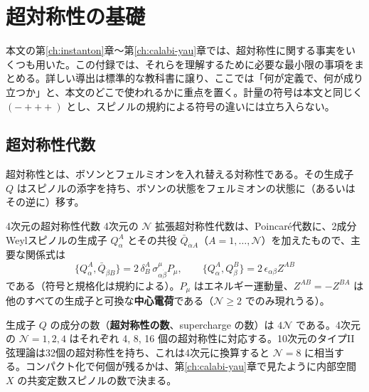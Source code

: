\documentclass[uplatex, dvipdfmx, book]{jsbook}
\let\origsection\section
\let\origsubsection\subsection
\let\origsubsubsection\subsubsection
\newcommand{\chapter}{\origsection}
\renewcommand{\section}{\origsubsection}
\renewcommand{\subsection}{\origsubsubsection}
\renewcommand{\subsubsection}{\paragraph}
\begin{document}
\chapter{超対称性の基礎}
\label{app:susy}

本文の第\ref{ch:instanton}章〜第\ref{ch:calabi-yau}章では、超対称性に関する事実をいくつも用いた。この付録では、それらを理解するために必要な最小限の事項をまとめる。詳しい導出は標準的な教科書に譲り、ここでは「何が定義で、何が成り立つか」と、本文のどこで使われるかに重点を置く。計量の符号は本文と同じく $(-+++)$ とし、スピノルの規約による符号の違いには立ち入らない。

\section{超対称性代数}

超対称性とは、ボソンとフェルミオンを入れ替える対称性である。その生成子 $Q$ はスピノルの添字を持ち、ボソンの状態をフェルミオンの状態に（あるいはその逆に）移す。

\begin{mydef}{4次元の超対称性代数}{}
4次元の $\mathcal{N}$ 拡張超対称性代数は、Poincar\'e代数に、2成分Weylスピノルの生成子 $Q^A_\alpha$ とその共役 $\bar{Q}_{\dot\alpha A}$（$A = 1, \dots, \mathcal{N}$）を加えたもので、主要な関係式は
\begin{equation*}
    \{ Q^A_\alpha, \bar{Q}_{\dot\beta B} \} = 2\,\delta^A_B\, \sigma^\mu_{\alpha\dot\beta} P_\mu, \qquad
    \{ Q^A_\alpha, Q^B_\beta \} = 2\,\epsilon_{\alpha\beta} Z^{AB}
\end{equation*}
である（符号と規格化は規約による）。$P_\mu$ はエネルギー運動量、$Z^{AB} = -Z^{BA}$ は他のすべての生成子と可換な\textbf{中心電荷}である（$\mathcal{N} \ge 2$ でのみ現れうる）。
\end{mydef}

生成子 $Q$ の成分の数（\textbf{超対称性の数}、supercharge の数）は $4\mathcal{N}$ である。4次元の $\mathcal{N} = 1, 2, 4$ はそれぞれ 4, 8, 16 個の超対称性に対応する。10次元のタイプII弦理論は32個の超対称性を持ち、これは4次元に換算すると $\mathcal{N} = 8$ に相当する。コンパクト化で何個が残るかは、第\ref{ch:calabi-yau}章で見たように内部空間 $X$ の共変定数スピノルの数で決まる。
\end{document}

